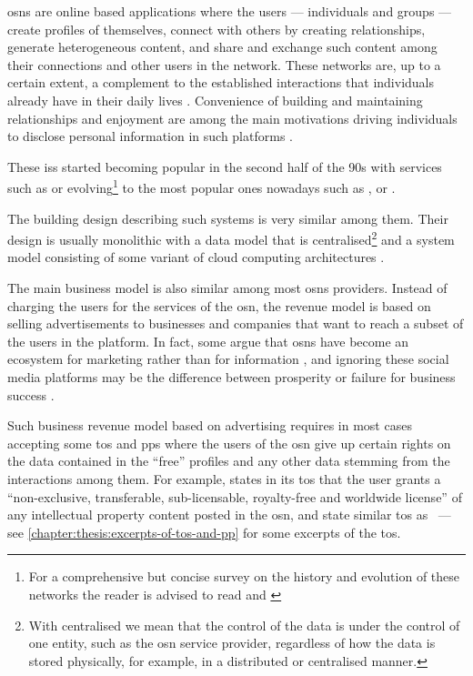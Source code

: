 \Acp{osn} are online based applications where the users --- individuals and groups 
--- create profiles of themselves, connect with others by creating relationships, 
generate heterogeneous content, and share and exchange such content among their 
connections and other users in the network. These networks are, up to a certain 
extent, a complement to the established interactions that individuals already have 
in their daily lives \cite{SubrahmanyamRWE08}. Convenience of building and maintaining 
relationships and enjoyment are among the main motivations driving individuals to 
disclose personal information in such platforms \cite{KrasnovaSKH10}.

These \acp{is} started becoming popular in the second half of the 90s 
with services such as \LiveJournal or \Friendster evolving\footnote{For a comprehensive 
but concise survey on the history and evolution of these networks the reader is 
advised to read \cite{boydE07} and \cite{HeidemannKP12}} to the most popular ones 
nowadays such as \Facebook, \LinkedIn or \Twitter.

The building design describing such systems is very similar among them. Their design 
is usually monolithic with a data model that is centralised\footnote{With centralised 
we mean that the control of the data is under the control of one entity, such as 
the \ac{osn} service provider, regardless of how the data is stored physically, 
for example, in a distributed or centralised manner.} and a system model consisting 
of some variant of cloud computing architectures \cite{PallisZD11}. 

The main business model is also similar among most \acp{osn} providers. Instead 
of charging the users for the services of the \ac{osn}, the revenue model is based 
on selling advertisements to businesses and companies that want to reach a subset 
of the users in the platform. In fact, some argue that \acp{osn} have become an 
ecosystem for marketing rather than for information \cite{HannaRC11}, and ignoring 
these social media platforms may be the difference between prosperity or failure 
for business success \cite{HarrisR09}.

Such business revenue model based on advertising requires in most cases accepting 
some \ac{tos} and \acp{pp} where the users of the \ac{osn} give up certain rights 
on the data contained in the ``free'' profiles and any other data stemming from 
the interactions among them. For example, \Facebook states in its \ac{tos} that 
the user grants a ``non-exclusive, transferable, sub-licensable, royalty-free and 
worldwide license'' of any intellectual property content posted in the \ac{osn}, 
\LinkedIn and \Twitter state similar \ac{tos} as \Facebook~--- see \cref{chapter:thesis:excerpts-of-tos-and-pp} 
for some excerpts of the \ac{tos}.

